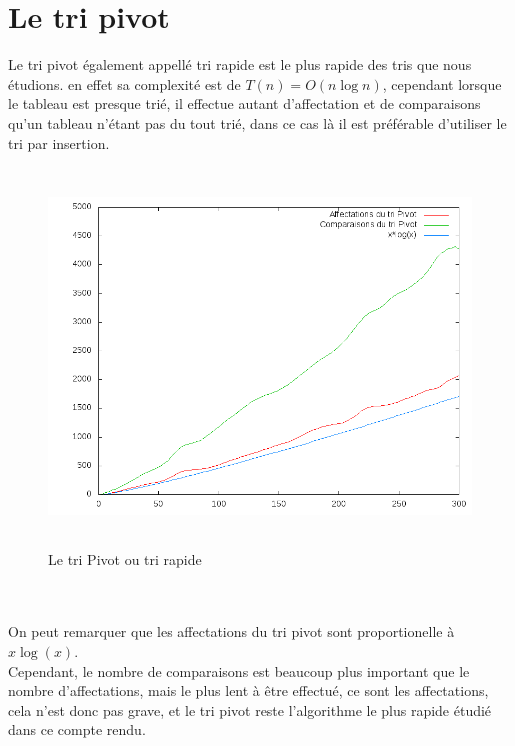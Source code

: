 \documentclass[12pt,a4paper,openany]{article}
\begin{document}
	\section{Le tri pivot}
		Le tri pivot également appellé tri rapide est le plus rapide des tris que nous étudions. en effet sa complexité est de $T(n) = O(n\log{n})$, cependant lorsque le tableau est presque trié, il effectue autant d'affectation et de comparaisons qu'un tableau n'étant pas du tout trié, dans ce cas là il est préférable d'utiliser le tri par insertion.
		\begin{figure}[!h] 
			\includegraphics[height=10cm]{triPivot.png}										
			\caption{Le tri Pivot ou tri rapide}
		\end{figure}\\ \\
		On peut remarquer que les affectations du tri pivot sont proportionelle à $x\log(x)$.\\
		Cependant, le nombre de comparaisons est beaucoup plus important que le nombre d'affectations, mais le plus lent à être effectué, ce sont les affectations, cela n'est donc pas grave, et le tri pivot reste l'algorithme le plus rapide étudié dans ce compte rendu. 
		\newpage		
\end{document}
